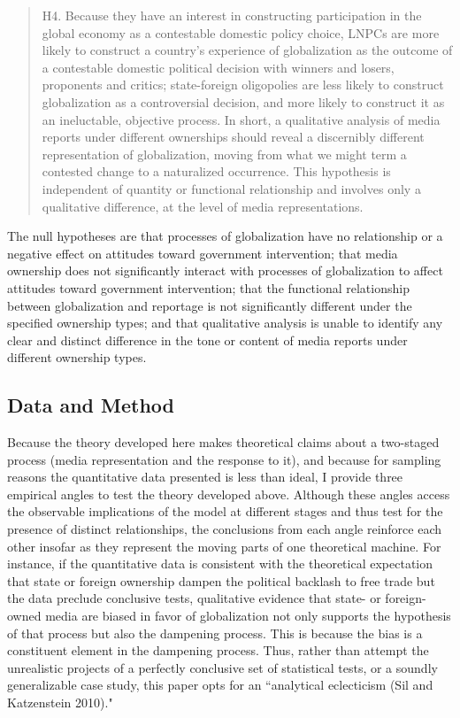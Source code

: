 \documentclass[12pt]{report}
\begin{document}
\singlespacing
\begin{quote}
H4. Because they have an interest in constructing participation in the global economy as a contestable domestic policy choice, LNPCs are more likely to construct a country's experience of globalization as the outcome of a contestable domestic political decision with winners and losers, proponents and critics; state-foreign oligopolies are less likely to construct globalization as a controversial decision, and more likely to construct it as an ineluctable, objective process. In short, a qualitative analysis of media reports under different ownerships should reveal a discernibly different representation of globalization, moving from what we might term a contested change to a naturalized occurrence. This hypothesis is independent of quantity or functional relationship and involves only a qualitative difference, at the level of media representations.
\end{quote}
\doublespacing

The null hypotheses are that processes of globalization have no relationship or a negative effect on attitudes toward government intervention; that media ownership does not significantly interact with processes of globalization to affect attitudes toward government intervention; that the functional relationship between globalization and reportage is not significantly different under the specified ownership types; and that qualitative analysis is unable to identify any clear and distinct difference in the tone or content of media reports under different ownership types.
\subsection{Data and Method}

Because the theory developed here makes theoretical claims about a two-staged process (media representation and the response to it), and because for sampling reasons the quantitative data presented is less than ideal, I provide three empirical angles to test the theory developed above. Although these angles access the observable implications of the model at different stages and thus test for the presence of distinct relationships, the conclusions from each angle reinforce each other insofar as they represent the moving parts of one theoretical machine. For instance, if the quantitative data is consistent with the theoretical expectation that state or foreign ownership dampen the political backlash to free trade but the data preclude conclusive tests, qualitative evidence that state- or foreign-owned media are biased in favor of globalization not only supports the hypothesis of that process but also the dampening process. This is because the bias is a constituent element in the dampening process. Thus, rather than attempt the unrealistic projects of a perfectly conclusive set of statistical tests, or a soundly generalizable case study, this paper opts for an ``analytical eclecticism (Sil and Katzenstein 2010)."
\end{document}
